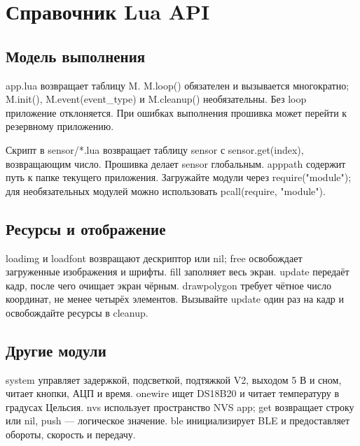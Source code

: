 \chapter{Справочник Lua API}
\section{Модель выполнения}
app.lua возвращает таблицу M. M.loop() обязателен и вызывается многократно; M.init(), M.event(event\_type) и M.cleanup() необязательны. Без loop приложение отклоняется. При ошибках выполнения прошивка может перейти к резервному приложению.

Скрипт в sensor/*.lua возвращает таблицу sensor с sensor.get(index), возвращающим число. Прошивка делает sensor глобальным. apppath содержит путь к папке текущего приложения. Загружайте модули через require("module"); для необязательных модулей можно использовать pcall(require, "module").
\section{Ресурсы и отображение}
loadimg и loadfont возвращают дескриптор или nil; free освобождает загруженные изображения и шрифты. fill заполняет весь экран. update передаёт кадр, после чего очищает экран чёрным. drawpolygon требует чётное число координат, не менее четырёх элементов. Вызывайте update один раз на кадр и освобождайте ресурсы в cleanup.
\section{Другие модули}
system управляет задержкой, подсветкой, подтяжкой V2, выходом 5 В и сном, читает кнопки, АЦП и время. onewire ищет DS18B20 и читает температуру в градусах Цельсия. nvs использует пространство NVS app; get возвращает строку или nil, push — логическое значение. ble инициализирует BLE и предоставляет обороты, скорость и передачу.
